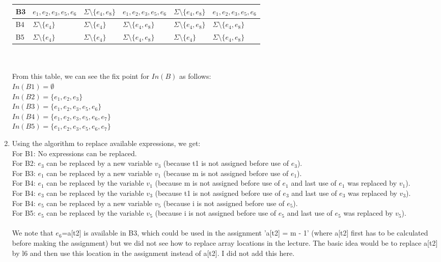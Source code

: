 \documentclass[12pt,fleqn]{article}		%
\begin{document}
\begin{enumerate}
\begin{tabularx}{\textwidth}{| l || X | X || X | X || X |}
\hline
B3 & $e_1, e_2, e_3, e_5, e_6$ & $\Sigma \setminus \{e_4, e_8\}$ & $e_1, e_2, e_3, e_5, e_6$ & $\Sigma \setminus \{e_4, e_8\}$ & $e_1, e_2, e_3, e_5, e_6$\\
\hline
B4 & $\Sigma \setminus \{e_4\}$ & $\Sigma \setminus \{e_4\}$ & $\Sigma \setminus \{e_4, e_8\}$ & $\Sigma \setminus \{e_4, e_8\}$ & $\Sigma \setminus \{e_4, e_8\}$\\
\hline
B5 & $\Sigma \setminus \{e_4\}$ & $\Sigma \setminus \{e_4\}$ & $\Sigma \setminus \{e_4, e_8\}$ & $\Sigma \setminus \{e_4\}$ & $\Sigma \setminus \{e_4, e_8\}$\\
\hline
\end{tabularx}
\\\\
From this table, we can see the fix point for $In(B)$ as follows:\\
$In(B1) = \emptyset$\\
$In(B2) = \{e_1, e_2, e_3\}$\\
$In(B3) = \{e_1, e_2, e_3, e_5, e_6\}$\\
$In(B4) = \{e_1, e_2, e_3, e_5, e_6, e_7\}$\\
$In(B5) = \{e_1, e_2, e_3, e_5, e_6, e_7\}$
\item Using the algorithm to replace available expressions, we get:\\
For B1: No expressions can be replaced.\\
For B2: $e_3$ can be replaced by a new variable $v_3$ (because t1 is not assigned before use of $e_3$).\\
For B3: $e_1$ can be replaced by a new variable $v_1$ (because m is not assigned before use of $e_1$).\\
For B4: $e_1$ can be replaced by the variable $v_1$ (because m is not assigned before use of $e_1$ and last use of $e_1$ was replaced by $v_1$).\\
For B4: $e_3$ can be replaced by the variable $v_3$ (because t1 is not assigned before use of $e_3$ and last use of $e_3$ was replaced by $v_3$).\\
For B4: $e_5$ can be replaced by a new variable $v_5$ (because i is not assigned before use of $e_5$).\\
For B5: $e_5$ can be replaced by the variable $v_5$ (because i is not assigned before use of $e_5$ and last use of $e_5$ was replaced by $v_5$).\\\\
We note that $e_6$=a[t2] is available in B3, which could be used in the assignment 'a[t2] = m - 1' (where a[t2] first has to be calculated before making the assignment) but we did not see how to replace array locations in the lecture. The basic idea would be to replace a[t2] by l6 and then use this location in the assignment instead of a[t2]. I did not add this here.

\end{enumerate}
\end{document}
